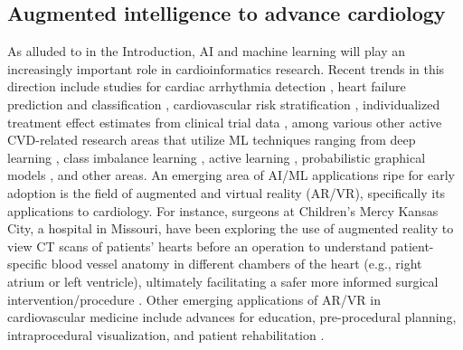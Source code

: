 \documentclass[letter]{bib}
\begin{document}
	\subsection*{Augmented intelligence to advance cardiology}
	As alluded to in the Introduction, AI and machine learning will play an increasingly important role in cardioinformatics research.  Recent trends in this direction include studies for cardiac arrhythmia detection \citep{Hannun:2019:Cardiologist}, heart failure prediction and classification \citep{Awan:2018:Machine,Choi:2017:Using,Shah:2015:phenomapping}, cardiovascular risk stratification \citep{Singh:2011:Acomparison}, individualized treatment effect estimates from clinical trial data \citep{Duan:2019:Clinical}, among various other active CVD-related research areas \citep{Johnson:2018:Artificial,Alaref:2018:Clinical,Krittanawong:2017:Artificial,Zeevi:2015:Personalized} that utilize ML techniques ranging from deep learning \citep{Hannun:2019:Cardiologist,Bizopoulos:2018:Deep,Madani:2018:Deep,Lee:2018:Deep,Kwon:2018:Algorithm,Choi:2017:Using}, class imbalance learning \citep{Liu:2014:Risk,Rahman2013AddressingTC}, active learning \citep{NIPS2010_4091}, probabilistic graphical models \citep{Orphanou:2016:DBN,Gong:2015:Inferring}, and other areas.  An emerging area of AI/ML applications ripe for early adoption is the field of augmented and virtual reality (AR/VR), specifically its applications to cardiology.  For instance, surgeons at Children's Mercy Kansas City, a hospital in Missouri, have been exploring the use of augmented reality to view CT scans of patients' hearts before an operation to understand patient-specific blood vessel anatomy in different chambers of the heart (e.g., right atrium or left ventricle), ultimately facilitating a safer more informed surgical intervention/procedure \citep{Matthews:2018:Virtual}.  Other emerging applications of AR/VR in cardiovascular medicine include advances for education, pre-procedural planning, intraprocedural visualization, and patient rehabilitation \citep{Silva:2018:Emerging}.         
	
\end{document}
